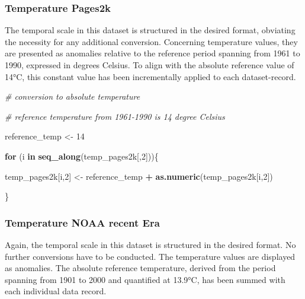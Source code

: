 \documentclass[
]{article}
\newenvironment{Shaded}{\begin{snugshade}}{\end{snugshade}}
\newcommand{\CommentTok}[1]{\textcolor[rgb]{0.56,0.35,0.01}{\textit{#1}}}
\newcommand{\ControlFlowTok}[1]{\textcolor[rgb]{0.13,0.29,0.53}{\textbf{#1}}}
\newcommand{\DecValTok}[1]{\textcolor[rgb]{0.00,0.00,0.81}{#1}}
\newcommand{\FunctionTok}[1]{\textcolor[rgb]{0.13,0.29,0.53}{\textbf{#1}}}
\newcommand{\NormalTok}[1]{#1}
\newcommand{\OtherTok}[1]{\textcolor[rgb]{0.56,0.35,0.01}{#1}}
\newcommand{\SpecialCharTok}[1]{\textcolor[rgb]{0.81,0.36,0.00}{\textbf{#1}}}
\begin{document}
\hypertarget{temperature-pages2k}{%
\subsubsection{Temperature Pages2k}\label{temperature-pages2k}}

The temporal scale in this dataset is structured in the desired format,
obviating the necessity for any additional conversion. Concerning
temperature values, they are presented as anomalies relative to the
reference period spanning from 1961 to 1990, expressed in degrees
Celsius. To align with the absolute reference value of 14°C, this
constant value has been incrementally applied to each dataset-record.

\begin{Shaded}
\begin{Highlighting}[]
\CommentTok{\# conversion to absolute temperature}

\CommentTok{\# reference temperature from 1961{-}1990 is 14 degree Celsius}

\NormalTok{reference\_temp }\OtherTok{\textless{}{-}} \DecValTok{14}

\ControlFlowTok{for}\NormalTok{ (i }\ControlFlowTok{in} \FunctionTok{seq\_along}\NormalTok{(temp\_pages2k[,}\DecValTok{2}\NormalTok{]))\{}
 
\NormalTok{    temp\_pages2k[i,}\DecValTok{2}\NormalTok{] }\OtherTok{\textless{}{-}}\NormalTok{ reference\_temp }\SpecialCharTok{+} \FunctionTok{as.numeric}\NormalTok{(temp\_pages2k[i,}\DecValTok{2}\NormalTok{])}
  
\NormalTok{\}}
\end{Highlighting}
\end{Shaded}

\hypertarget{temperature-noaa-recent-era}{%
\subsubsection{Temperature NOAA recent
Era}\label{temperature-noaa-recent-era}}

Again, the temporal scale in this dataset is structured in the desired
format. No further conversions have to be conducted. The temperature
values are displayed as anomalies. The absolute reference temperature,
derived from the period spanning from 1901 to 2000 and quantified at
13.9°C, has been summed with each individual data record.
\end{document}

